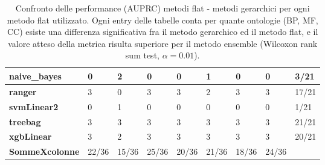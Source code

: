 \documentclass[12pt]{report}
\begin{document}
\begin{appendices}
\begin{table}[h!]
{\begin{tabular}{|l|l|l|l|l|l|l|l|l|}
\textbf{naive\_bayes}  & 0             & 2            & 0               & 0                   & 1               & 0                   & 0              & 3/21                 \\ \hline
\textbf{ranger}        & 3             & 0            & 3               & 3                   & 2               & 3                   & 3              & 17/21                \\ \hline
\textbf{svmLinear2}    & 0             & 1            & 0               & 0                   & 0               & 0                   & 0              & 1/21                 \\ \hline
\textbf{treebag}       & 3             & 3            & 3               & 3                   & 3               & 3                   & 3              & 21/21                \\ \hline
\textbf{xgbLinear}     & 3             & 2            & 3               & 3                   & 3               & 3                   & 3              & 20/21                \\ \hline
\textbf{SommeXcolonne} & 22/36         & 15/36        & 25/36           & 20/36               & 21/36           & 18/36               & 24/36          &                      \\ \hline
\end{tabular}}
\caption{\footnotesize{Confronto delle performance (AUPRC) metodi flat - metodi gerarchici per ogni metodo flat utilizzato. Ogni entry delle tabelle conta per quante ontologie (BP, MF, CC) esiste una differenza significativa fra il metodo gerarchico ed il metodo flat, e il valore atteso della metrica risulta superiore per il metodo ensemble (Wilcoxon rank sum test, $\alpha = 0.01$).}}
\label{AUPRC_1_}
\end{table}


\end{appendices}
\end{document}
